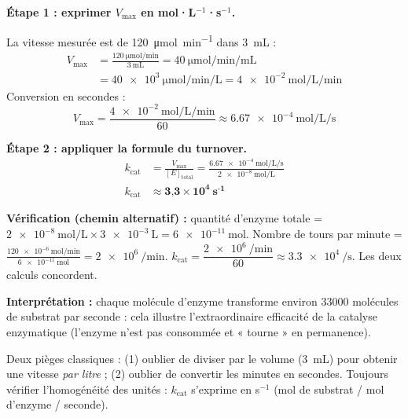 \documentclass[11pt]{article}
\begin{document}
\begin{corrige}
\textbf{Étape 1 : exprimer $V_{\text{max}}$ en mol·L$^{-1}$·s$^{-1}$.}

La vitesse mesurée est de \SI{120}{\micro\mol\per\minute} dans \SI{3}{\mL} :
\begin{align*}
V_{\text{max}} &= \frac{\SI{120}{\micro\mol\per\minute}}{\SI{3}{\mL}} = \SI{40}{\micro\mol\per\minute\per\mL} \\
&= \SI{40e3}{\micro\mol\per\minute\per\liter} = \SI{4e-2}{\mol\per\liter\per\minute}
\end{align*}
Conversion en secondes :
\[ V_{\text{max}} = \frac{\SI{4e-2}{\mol\per\liter\per\minute}}{60} \approx \SI{6,67e-4}{\mol\per\liter\per\second} \]

\textbf{Étape 2 : appliquer la formule du turnover.}
\begin{align*}
k_{\text{cat}} &= \frac{V_{\text{max}}}{[E]_{\text{total}}} = \frac{\SI{6,67e-4}{\mol\per\liter\per\second}}{\SI{2e-8}{\mol\per\liter}} \\
k_{\text{cat}} &\approx \textbf{3,3} \times \textbf{10}^{\textbf{4}}\ \textbf{s}^{\textbf{-1}}
\end{align*}

\textbf{Vérification (chemin alternatif) :} quantité d'enzyme totale = $\SI{2e-8}{\mol\per\liter} \times \SI{3e-3}{\liter} = \SI{6e-11}{\mol}$. Nombre de tours par minute = $\frac{\SI{120e-6}{\mol\per\minute}}{\SI{6e-11}{\mol}} = \SI{2e6}{\per\minute}$. $k_{\text{cat}} = \dfrac{\SI{2e6}{\per\minute}}{60} \approx \SI{3,3e4}{\per\second}$. Les deux calculs concordent.

\textbf{Interprétation :} chaque molécule d'enzyme transforme environ \num{33000} molécules de substrat par seconde : cela illustre l'extraordinaire efficacité de la catalyse enzymatique (l'enzyme n'est pas consommée et « tourne » en permanence).
\end{corrige}

\begin{attention}
Deux pièges classiques : (1) oublier de diviser par le volume (\SI{3}{\mL}) pour obtenir une vitesse \emph{par litre} ; (2) oublier de convertir les minutes en secondes. Toujours vérifier l'homogénéité des unités : $k_{\text{cat}}$ s'exprime en s$^{-1}$ (mol de substrat / mol d'enzyme / seconde).
\end{attention}
\end{document}
